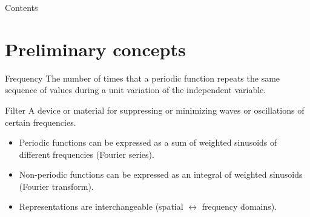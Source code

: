 


\subtitle{Filtering in the Frequency Domain} %





\begin{frame}
\titlepage %
\end{frame}


\begin{frame}{Contents}
\setcounter{tocdepth}{1}
\tableofcontents
\end{frame}




\section{Preliminary concepts}


\begin{frame}
\begin{block}{Frequency}
The number of times that a periodic function repeats the same sequence of values during  a unit variation of the independent variable.
\end{block}
\begin{block}{Filter}
A device or material for suppressing or minimizing waves or oscillations of certain frequencies.
\end{block}
\end{frame}


\begin{frame}
\begin{itemize}
\item Periodic functions can be expressed as a sum of weighted sinusoids of different frequencies (Fourier series).
\item Non-periodic functions can be expressed as an integral of weighted sinusoids (Fourier transform).
\item Representations are interchangeable (spatial $\leftrightarrow$ frequency domains).
\end{itemize}
\end{frame}

